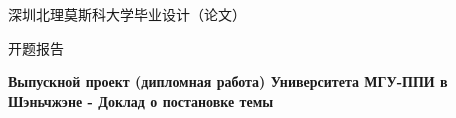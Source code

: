 \documentclass[12pt,a4paper]{ctexart}
\newcommand{\cyr}[1]{{\cyrfont #1}}
\begin{document}
\begin{center}
    { 深圳北理莫斯科大学毕业设计（论文）}

    \vspace{0.3cm}
    { 开题报告}

    \vspace{0.3cm}
    {\bfseries\cyr{Выпускной проект (дипломная работа) Университета МГУ-ППИ в Шэньчжэне - Доклад о постановке темы}}
\end{center}

\vspace{0.5cm}

\renewcommand{\arraystretch}{1.6}
\setlength{\tabcolsep}{4pt}

\noindent
\end{document}

